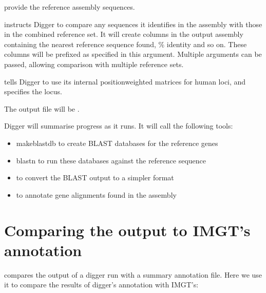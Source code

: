 \documentclass[letterpaper,10pt,english]{sphinxmanual}
\begin{document}
\sphinxAtStartPar
{} provide the reference assembly sequences.

\sphinxAtStartPar
{} instructs Digger to compare any sequences it identifies in the assembly with those in the combined reference
set. It will create columns in the output assembly containing the nearest reference sequence found, \% identity and so on. These columns will be prefixed  as specified in this argument. Multiple  arguments can be
passed, allowing comparison with multiple reference sets.

\sphinxAtStartPar
{} tells Digger to use its internal position\sphinxhyphen{}weighted matrices for human loci, and  specifies the locus.

\sphinxAtStartPar
The output file will be .

\sphinxAtStartPar
Digger will summarise progress as it runs. It will call the following tools:
\begin{itemize}
\item {} 
\sphinxAtStartPar
makeblastdb to create BLAST databases for the reference genes

\item {} 
\sphinxAtStartPar
blastn to run these databases against the reference sequence

\item {} 
\sphinxAtStartPar
{\hyperref[\detokenize{tools/blastresults_to_csv:blastresults-to-csv}]{}} to convert the BLAST output to a simpler format

\item {} 
\sphinxAtStartPar
{\hyperref[\detokenize{tools/find_alignments:find-alignments}]{}} to annotate gene alignments found in the assembly

\end{itemize}


\section{Comparing the output to IMGT’s annotation}
\label{\detokenize{examples/human_igh:comparing-the-output-to-imgt-s-annotation}}
\sphinxAtStartPar
{\hyperref[\detokenize{tools/compare_annotations:compare-annotations}]{}} compares the output of a digger run with a summary annotation file. Here we use it to compare the results of digger’s annotation with IMGT’s:
\end{document}
